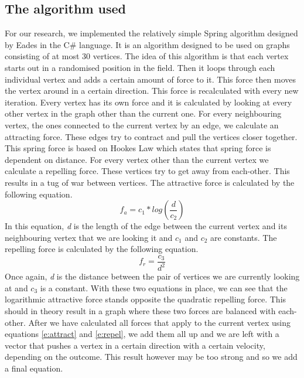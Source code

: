 \documentclass[a4paper,12pt,twoside]{article}
\begin{document}
\subsection{The algorithm used}\label{s:algorithm}
For our research, we implemented the relatively simple Spring algorithm designed by Eades\cite{Eades} in the C\# language. It is an algorithm designed to be used on graphs consisting of at most 30 vertices. The idea of this algorithm is that each vertex starts out in a randomised position in the field. Then it loops through each individual vertex and adds a certain amount of force to it. This force then moves the vertex around in a certain direction. This force is recalculated with every new iteration. Every vertex has its own force and it is calculated by looking at every other vertex in the graph other than the current one. For every neighbouring vertex, the ones connected to the current vertex by an edge, we calculate an attracting force. These edges try to contract and pull the vertices closer together. This spring force is based on Hookes Law\cite{Hooke} which states that spring force is dependent on distance. For every vertex other than the current vertex we calculate a repelling force. These vertices try to get away from each-other. This results in a tug of war between vertices. 
\newline
The attractive force is calculated by the following equation.
\begin{equation}\label{e:attract}
f_a = c_1*log(\frac{d}{c_2})
\end{equation}
In this equation, \emph{d} is the length of the edge between the current vertex and its neighbouring vertex that we are looking it and \emph{$c_1$} and \emph{$c_2$} are constants.
\newline
The repelling force is calculated by the following equation.
\begin{equation}\label{e:repel}
f_r = \frac{c_3}{d^2}
\end{equation}
Once again, \emph{d} is the distance between the pair of vertices we are currently looking at and \emph{$c_3$} is a constant. With these two equations in place, we can see that the logarithmic attractive force stands opposite the quadratic repelling force. This should in theory result in a graph where these two forces are balanced with each-other.
\newline
After we have calculated all forces that apply to the current vertex using equations \ref{e:attract} and \ref{e:repel}, we add them all up and we are left with a vector that pushes a vertex in a certain direction with a certain velocity, depending on the outcome. This result however may be too strong and so we add a final equation.
\end{document}
